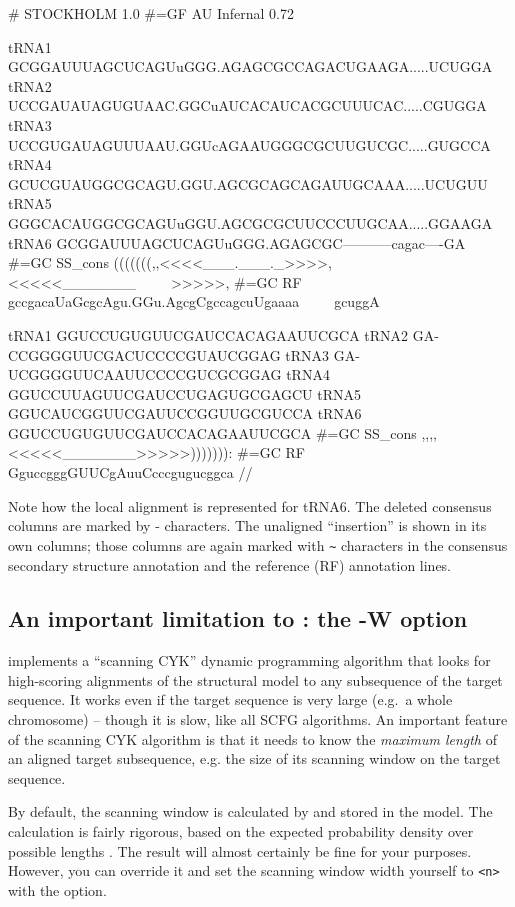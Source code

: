 {\samepage
\begin{sreoutput}
# STOCKHOLM 1.0
#=GF AU    Infernal 0.72

tRNA1             GCGGAUUUAGCUCAGUuGGG.AGAGCGCCAGACUGAAGA.....UCUGGA
tRNA2             UCCGAUAUAGUGUAAC.GGCuAUCACAUCACGCUUUCAC.....CGUGGA
tRNA3             UCCGUGAUAGUUUAAU.GGUcAGAAUGGGCGCUUGUCGC.....GUGCCA
tRNA4             GCUCGUAUGGCGCAGU.GGU.AGCGCAGCAGAUUGCAAA.....UCUGUU
tRNA5             GGGCACAUGGCGCAGUuGGU.AGCGCGCUUCCCUUGCAA.....GGAAGA
tRNA6             GCGGAUUUAGCUCAGUuGGG.AGAGCGC-----------cagac----GA
#=GC SS_cons      (((((((,,<<<<___.___._>>>>,<<<<<_______~~~~~>>>>>,
#=GC RF           gccgacaUaGcgcAgu.GGu.AgcgCgccagcuUgaaaa~~~~~gcuggA

tRNA1             GGUCCUGUGUUCGAUCCACAGAAUUCGCA
tRNA2             GA-CCGGGGUUCGACUCCCCGUAUCGGAG
tRNA3             GA-UCGGGGUUCAAUUCCCCGUCGCGGAG
tRNA4             GGUCCUUAGUUCGAUCCUGAGUGCGAGCU
tRNA5             GGUCAUCGGUUCGAUUCCGGUUGCGUCCA
tRNA6             GGUCCUGUGUUCGAUCCACAGAAUUCGCA
#=GC SS_cons      ,,,,<<<<<_______>>>>>))))))):
#=GC RF           GguccgggGUUCgAuuCcccgugucggca
//
\end{sreoutput}
}

Note how the local alignment is represented for tRNA6. The deleted
consensus columns are marked by - characters. The unaligned
``insertion'' is shown in its own columns; those columns are again
marked with \verb+~+ characters in the consensus secondary structure
annotation and the reference (RF) annotation lines.

\subsection{An important limitation to : the -W option}

 implements a ``scanning CYK'' dynamic programming
algorithm \cite{Durbin98} that looks for high-scoring alignments of
the structural model to any subsequence of the target sequence. It
works even if the target sequence is very large (e.g.\ a whole
chromosome) -- though it is slow, like all SCFG algorithms. An
important feature of the scanning CYK algorithm is that it needs to
know the \emph{maximum length} of an aligned target subsequence, e.g.
the size of its scanning window on the target sequence.

By default, the scanning window is calculated by  and
stored in the model. The calculation is fairly rigorous, based on the
expected probability density over possible lengths
\cite{NawrockiEddy07}. The result will almost certainly be fine for
your purposes.  However, you can override it and set the scanning
window width yourself to \verb+<n>+ with the  option.

